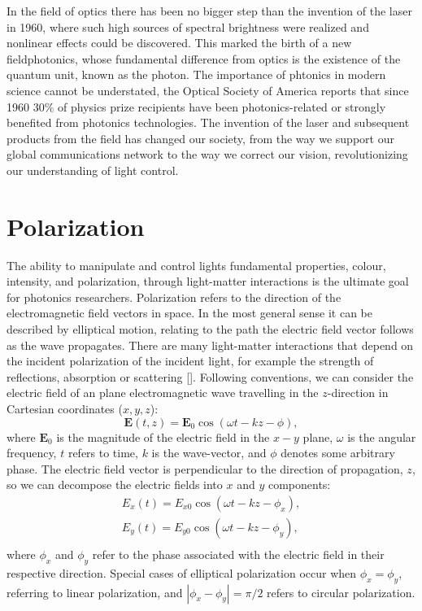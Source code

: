 In the field of optics there has been no bigger step than the invention of the laser in 1960, where such high sources of spectral brightness were realized and nonlinear effects could be discovered. This marked the birth of a new field\textemdash photonics, whose fundamental difference from optics is the existence of the quantum unit, known as the photon. The importance of phtonics in modern science cannot be understated, the Optical Society of America reports that since 1960 30\% of physics prize recipients have been photonics-related or strongly benefited from photonics technologies. The invention of the laser and subsequent products from the field has changed our society, from the way we support our global communications network to the way we correct our vision, revolutionizing our understanding of light control. 

\section{Polarization}
The ability to manipulate and control lights fundamental properties, colour, intensity, and polarization, through light-matter interactions is the ultimate goal for photonics researchers. Polarization refers to the direction of the electromagnetic field vectors in space. In the most general sense it can be described by elliptical motion, relating to the path the electric field vector follows as the wave propagates. There are many light-matter interactions that depend on the incident polarization of the incident light, for example the strength of reflections, absorption or scattering [\cite{Hulst}]. Following conventions, we can consider the electric field of an plane electromagnetic wave travelling in the $z$-direction in Cartesian coordinates ($x,y,z$):
\begin{equation}
\mathbf{E}(t, z) =\mathbf{E}_0 \cos(\omega t-kz-\phi),
\end{equation}where $\mathbf{E}_0$ is the magnitude of the electric field in the $x-y$ plane, $\omega$ is the angular frequency, $t$ refers to time, $k$ is the wave-vector, and $\phi$ denotes some arbitrary phase. The electric field vector is perpendicular to the direction of propagation, $z$, so we can decompose the electric fields into $x$ and $y$ components:
\begin{equation}
\begin{aligned}
E_x(t) = E_{x0} \cos(\omega t-kz-\phi_x),\\
E_y(t) = E_{y0} \cos(\omega t-kz-\phi_y),\\
\end{aligned}
\end{equation}
where $\phi_x$ and $\phi_y$ refer to the phase associated with the electric field in their respective direction. Special cases of elliptical polarization occur when $\phi_x = \phi_y$, referring to linear polarization, and $|\phi_x-\phi_y| = \pi/2$ refers to circular polarization.

